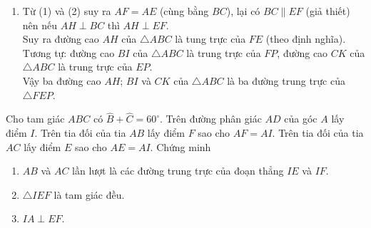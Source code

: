 \begin{bt}
{\begin{enumerate}
{}
\item Từ (1) và (2) suy ra $AF=AE$ (cùng bằng $BC$), lại có $BC\parallel EF$ (giả thiết) nên nếu $AH\perp BC$ thì $AH\perp EF$.\\
Suy ra đường cao $AH$ của $\triangle ABC$ là tung trực của $FE$ (theo định nghĩa).\\
Tương tự: đường cao $BI$ của $\triangle ABC$ là trung trực của $FP$, đường cao $CK$ của $\triangle ABC$ là trung trực của $EP$.\\
Vậy ba đường cao $AH$; $BI$ và $CK$ của $\triangle ABC$ là ba đường trung trực của $\triangle FEP$.
\end{enumerate}
}
\end{bt}
\begin{bt}%
	Cho tam giác $ABC$ có $\widehat{B}+\widehat{C}=60^\circ$. Trên đường phân giác $AD$ của góc $A$ lấy điểm $I$. Trên tia đối của tia $AB$ lấy điểm $F$ sao cho $AF=AI$. Trên tia đối của tia $AC$ lấy điểm $E$ sao cho $AE=AI$. Chứng minh
	\begin{enumerate}
		\item $AB$ và $AC$ lần lượt là các đường trung trực của đoạn thẳng $IE$ và $IF$.
		\item $\triangle IEF$ là tam giác đều.
		\item $IA\perp EF$.
	\end{enumerate}
\end{bt}
